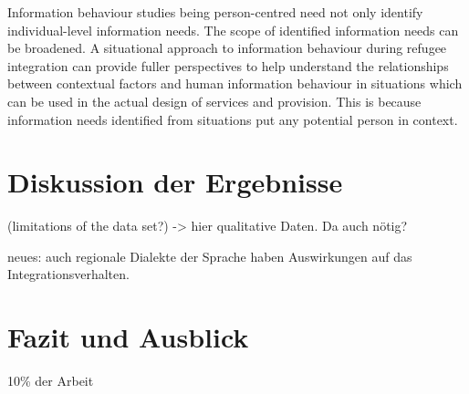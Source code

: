 \documentclass[12pt,oneside]{article}
\begin{document}
Information behaviour studies being person-centred need
not only identify individual-level information needs. The
scope of identified information needs can be broadened. A
situational approach to information behaviour during
refugee integration can provide fuller perspectives to help
understand the relationships between contextual factors and
human information behaviour in situations which can be
used in the actual design of services and provision. This is
because information needs identified from situations put
any potential person in context.












\section{Diskussion der Ergebnisse}
(limitations of the data set?) -> hier qualitative Daten. Da auch nötig?

neues: auch regionale Dialekte der Sprache haben Auswirkungen auf das Integrationsverhalten.

\section{Fazit und Ausblick}

10\% der Arbeit

\clearpage
\lhead{}
\printbibliography
{}



\newpage
\end{document}
